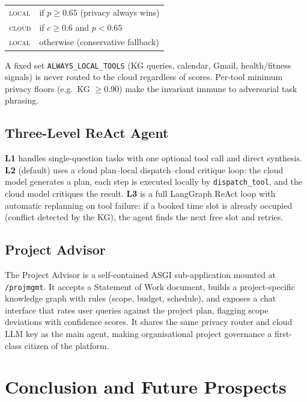 \documentclass[10pt,twocolumn]{article}
\begin{document}
\begin{center}
\small
\begin{tabular}{@{}ll@{}}
  \textsc{local} & if $p \geq 0.65$ \;(privacy always wins)\\
  \textsc{cloud} & if $c \geq 0.6$ and $p < 0.65$\\
  \textsc{local} & otherwise (conservative fallback)
\end{tabular}
\end{center}

\medskip\noindent
A fixed set \texttt{ALWAYS\_LOCAL\_TOOLS} (KG queries, calendar, Gmail,
health/fitness signals) is never routed to the cloud regardless of scores.
Per-tool minimum privacy floors (e.g.\ KG $\geq 0.90$) make the invariant
immune to adversarial task phrasing.

\subsection{Three-Level ReAct Agent}

\textbf{L1} handles single-question tasks with one optional tool call and
direct synthesis.
\textbf{L2} (default) uses a cloud plan–local dispatch–cloud critique loop:
the cloud model generates a plan, each step is executed locally by
\texttt{dispatch\_tool}, and the cloud model critiques the result.
\textbf{L3} is a full LangGraph ReAct loop with automatic replanning on tool
failure: if a booked time slot is already occupied (conflict detected by the
KG), the agent finds the next free slot and retries.

\subsection{Project Advisor}

The Project Advisor is a self-contained ASGI sub-application mounted at
\texttt{/projmgmt}.
It accepts a Statement of Work document, builds a project-specific knowledge
graph with rules (scope, budget, schedule), and exposes a chat interface that
rates user queries against the project plan, flagging scope deviations with
confidence scores.
It shares the same privacy router and cloud LLM key as the main agent,
making organisational project governance a first-class citizen of the platform.

\section{Conclusion and Future Prospects}
\end{document}
